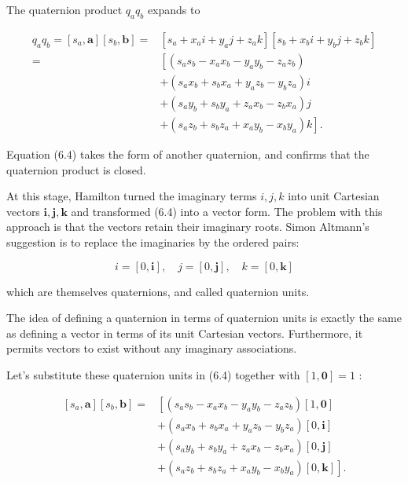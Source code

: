 The quaternion product $q_{a} q_{b}$ expands to

$$
    \begin{aligned}
        q_{a} q_{b}=\left[s_{a}, \mathbf{a}\right]\left[s_{b}, \mathbf{b}\right]= & {\left[s_{a}+x_{a} i+y_{a} j+z_{a} k\right]\left[s_{b}+x_{b} i+y_{b} j+z_{b} k\right] } \\
        =                                                                         & {\left[\left(s_{a} s_{b}-x_{a} x_{b}-y_{a} y_{b}-z_{a} z_{b}\right)\right.}             \\
                                                                                  & +\left(s_{a} x_{b}+s_{b} x_{a}+y_{a} z_{b}-y_{b} z_{a}\right) i                         \\
                                                                                  & +\left(s_{a} y_{b}+s_{b} y_{a}+z_{a} x_{b}-z_{b} x_{a}\right) j                         \\
                                                                                  & \left.+\left(s_{a} z_{b}+s_{b} z_{a}+x_{a} y_{b}-x_{b} y_{a}\right) k\right] .
    \end{aligned}
$$

Equation (6.4) takes the form of another quaternion, and confirms that the quaternion product is closed.

At this stage, Hamilton turned the imaginary terms $i, j, k$ into unit Cartesian vectors $\mathbf{i}, \mathbf{j}, \mathbf{k}$ and transformed (6.4) into a vector form. The problem with this approach is that the vectors retain their imaginary roots. Simon Altmann's suggestion is to replace the imaginaries by the ordered pairs:

$$
    i=[0, \mathbf{i}], \quad j=[0, \mathbf{j}], \quad k=[0, \mathbf{k}]
$$

which are themselves quaternions, and called quaternion units.

The idea of defining a quaternion in terms of quaternion units is exactly the same as defining a vector in terms of its unit Cartesian vectors. Furthermore, it permits vectors to exist without any imaginary associations.

Let's substitute these quaternion units in (6.4) together with $[1, \mathbf{0}]=1$ :

$$
    \begin{aligned}
        {\left[s_{a}, \mathbf{a}\right]\left[s_{b}, \mathbf{b}\right]=} & {\left[\left(s_{a} s_{b}-x_{a} x_{b}-y_{a} y_{b}-z_{a} z_{b}\right)[1, \mathbf{0}]\right.}  \\
                                                                        & +\left(s_{a} x_{b}+s_{b} x_{a}+y_{a} z_{b}-y_{b} z_{a}\right)[0, \mathbf{i}]                \\
                                                                        & +\left(s_{a} y_{b}+s_{b} y_{a}+z_{a} x_{b}-z_{b} x_{a}\right)[0, \mathbf{j}]                \\
                                                                        & \left.+\left(s_{a} z_{b}+s_{b} z_{a}+x_{a} y_{b}-x_{b} y_{a}\right)[0, \mathbf{k}]\right] .
    \end{aligned}
$$

